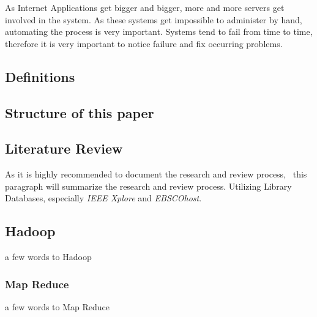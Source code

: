 As Internet Applications get bigger and bigger, more and more servers get involved in the system. As these systems get impossible to administer by hand, automating the process is very important. Systems tend to fail from time to time, therefore it is very important to notice failure and fix occurring problems.


\subsection{Definitions}

\subsection{Structure of this paper}
\subsection{Literature Review}
	As it is highly recommended to document the research and review process,~\cite{brocke09} this paragraph will summarize the research and review process.
	Utilizing Library Databases, especially \emph{IEEE Xplore} and \emph{EBSCOhost}.
	
\subsection{Hadoop}
a few words to Hadoop
\subsubsection*{Map Reduce}
a few words to Map Reduce